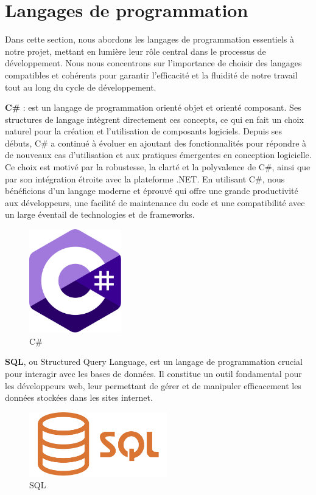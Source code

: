 \section{Langages de programmation}

\hspace{\parindent}Dans cette section, nous abordons les langages de programmation essentiels à notre projet, mettant en lumière leur rôle central dans le processus de développement. Nous nous concentrons sur l'importance de choisir des langages compatibles et cohérents pour garantir l'efficacité et la fluidité de notre travail tout au long du cycle de développement.

\textbf{C\#} : est un langage de programmation orienté objet et orienté composant. Ses structures de langage intègrent directement ces concepts, ce qui en fait un choix naturel pour la création et l'utilisation de composants logiciels. Depuis ses débuts, C\# a continué à évoluer en ajoutant des fonctionnalités pour répondre à de nouveaux cas d'utilisation et aux pratiques émergentes en conception logicielle. Ce choix est motivé par la robustesse, la clarté et la polyvalence de C\#, ainsi que par son intégration étroite avec la plateforme .NET. En utilisant C\#, nous bénéficions d'un langage moderne et éprouvé qui offre une grande productivité aux développeurs, une facilité de maintenance du code et une compatibilité avec un large éventail de technologies et de frameworks.
\\
\begin{figure}[H]
    \centering
    \includegraphics[width=4cm]{Figures/csharp.png}
    \caption{C\#}
\end{figure}


\textbf{SQL}, ou Structured Query Language, est un langage de programmation crucial pour interagir avec les bases de données. Il constitue un outil fondamental pour les développeurs web, leur permettant de gérer et de manipuler efficacement les données stockées dans les sites internet.
\\
\begin{figure}[H]
    \centering
    \includegraphics[width=6cm]{Figures/sql.png}
    \caption{SQL}
\end{figure}




